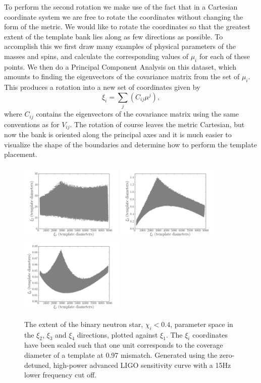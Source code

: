 To perform the second rotation we make use of the fact that in a Cartesian
coordinate system we are free to rotate the coordinates without changing the
form of the metric. We would like to rotate the coordinates so that the
greatest extent of the template bank lies along as few directions as possible.
To accomplish this we first draw many examples of physical parameters of the
masses and spins, and calculate the corresponding values of $\mu_i$ for each
of these points.  We then do a Principal Component Analysis on this dataset,
which amounts to finding the eigenvectors of the covariance matrix from the
set of $\mu_i$.  This produces a rotation into a new set of coordinates given
by
%
\begin{equation}
 \xi_i = \sum_{j} \left(C_{ij} \mu^{j}\right),
\end{equation}
%
where $C_{ij}$ contains the eigenvectors of the covariance matrix 
using the same conventions as for $V_{ij}$. 
The rotation of course leaves the metric Cartesian, but now the bank is oriented
along the principal axes and it is much easier to visualize the shape of the
boundaries and determine how to perform the template placement.

\begin{figure}[!ht]
\includegraphics[width=0.44\textwidth]{papers/bns_spin/figure2a.png}
\includegraphics[width=0.44\textwidth]{papers/bns_spin/figure2b.png}
\includegraphics[width=0.44\textwidth]{papers/bns_spin/figure2c.png}
\caption{\label{fig:param_space_extent} The extent of the binary neutron star, $\chi_i < 0.4$,
parameter space in the $\xi_2$, $\xi_3$ and $\xi_4$
directions, plotted against $\xi_1$. The $\xi_i$ coordinates have been scaled
such that one unit corresponds to the coverage diameter of a template
at 0.97 mismatch. Generated
using the zero-detuned, high-power advanced LIGO sensitivity curve with a 15Hz lower frequency cut off.
}
\end{figure}


